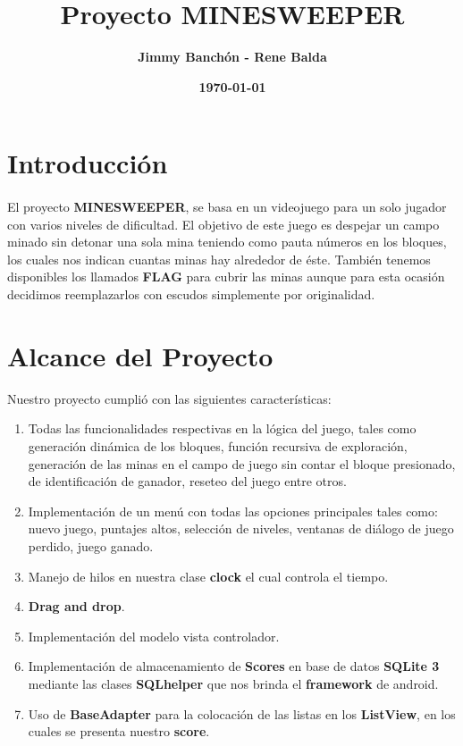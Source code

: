 \documentclass[11pt]{article}
\title{\textbf{Proyecto MINESWEEPER}}
\author{\textbf{Jimmy Banchón - Rene Balda}}
\date{\textbf{\today}}
\begin{document}


\maketitle
\section{\textbf{Introducción}} 
\paragraph{} \noindent
El proyecto {\textbf{MINESWEEPER}}, se basa en un videojuego para un solo jugador con varios niveles de dificultad.
El objetivo de este juego es despejar un campo minado sin detonar una sola mina teniendo como pauta números en los
bloques, los cuales nos indican cuantas minas hay alrededor de éste. También tenemos disponibles  los llamados  {\textbf{FLAG}}
para cubrir las minas aunque para esta ocasión decidimos reemplazarlos con escudos  simplemente por originalidad.
\section{\textbf{Alcance del Proyecto}}

Nuestro proyecto cumplió con las siguientes características:
\begin{enumerate}
\item 
Todas las funcionalidades respectivas en la lógica del juego, tales como generación dinámica de los bloques,
función recursiva de exploración, generación de las minas en el campo de juego sin contar el bloque presionado, de identificación de ganador,
reseteo del juego entre otros.

\item
Implementación de un menú con todas las opciones principales tales como: nuevo juego, puntajes altos, selección de niveles, ventanas de diálogo
de juego perdido, juego ganado.

\item
 Manejo de hilos en nuestra clase {\textbf{clock}} el cual controla el tiempo.

\item
{\textbf{Drag and drop}}.

\item
Implementación del modelo vista controlador.

\item
Implementación de almacenamiento de {\textbf{Scores}} en base de datos {\textbf{SQLite 3}} mediante las clases {\textbf{SQLhelper}} que nos brinda el {\textbf{framework}} 			de android.

\item
Uso de {\textbf{BaseAdapter}} para la colocación de las listas en los  {\textbf{ListView}}, en los cuales se presenta nuestro  {\textbf{score}}.
\end{enumerate}
\end{document}
